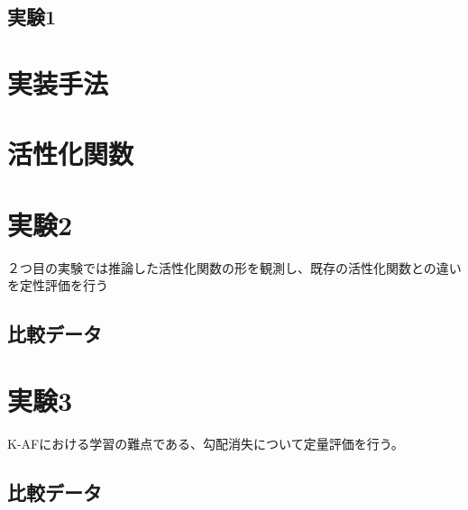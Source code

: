 \subsection{実験1}
\section{実装手法}


\section{活性化関数}




\section{実験2}
\label{exp2}
２つ目の実験では推論した活性化関数の形を観測し、既存の活性化関数との違いを定性評価を行う
\subsection{比較データ}


\section{実験3}
\label{exp3}
K-AFにおける学習の難点である、勾配消失について定量評価を行う。
\subsection{比較データ}


